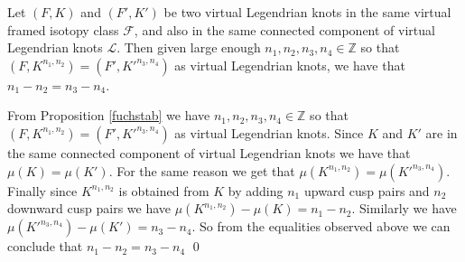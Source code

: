 % 
% 
% 
% 
% 

\begin{thm}
Let $(F, K)$ and $(F', K')$ be two virtual Legendrian knots in the same virtual framed isotopy class $\mathcal{F}$, and also in the same connected component of virtual Legendrian knots $\mathcal{L}$. Then given large enough $n_1, n_2, n_3, n_4 \in \mathbb{Z}$ so that $(F, K^{n_1,n_2}) = (F',K'^{n_3, n_4})$ as virtual Legendrian knots, we have that $n_1-n_2 = n_3-n_4$.
\end{thm}

\pp
From Proposition \ref{fuchstab} we have $n_1, n_2, n_3, n_4\in\mathbb{Z}$ so that $(F, K^{n_1,n_2}) = (F',K'^{n_3, n_4})$ as virtual Legendrian knots.  Since $K$ and $K'$ are in the same connected component of virtual Legendrian knots we have that $\mu(K)=\mu(K')$.  For the same reason we get that $\mu(K^{n_1, n_2})=\mu(K'^{n_3,n_4})$.  Finally since $K^{n_1,n_2}$ is obtained from $K$ by adding $n_1$ upward cusp pairs and $n_2$ downward cusp pairs we have $\mu(K^{n_1,n_2})-\mu(K) = n_1 - n_2$.  Similarly we have $\mu(K'^{n_3,n_4})-\mu(K')=n_3-n_4$.  So from the equalities observed above we can conclude that $n_1-n_2=n_3-n_4$
\qed


